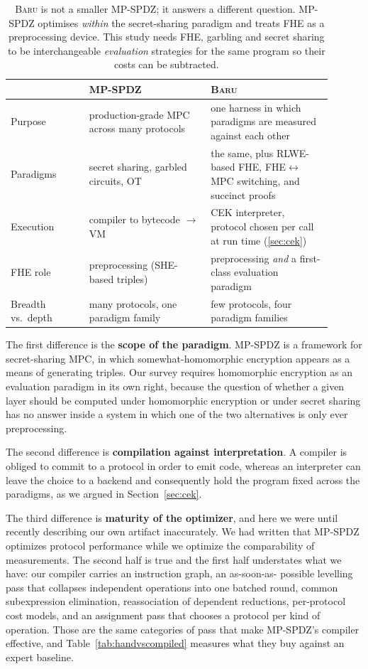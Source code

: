\documentclass[11pt]{article}
\newcommand{\Baru}{\textsc{Baru}}
\begin{document}
\begin{table}[t]
\centering
\small
\begin{tabular}{@{}p{0.22\linewidth}p{0.34\linewidth}p{0.34\linewidth}@{}}
\toprule
 & MP-SPDZ~\cite{MPSPDZ} & \Baru{} \\
\midrule
Purpose & production-grade MPC across many protocols & one harness in which paradigms are measured against each other \\
Paradigms & secret sharing, garbled circuits, OT & the same, plus RLWE-based FHE, FHE$\leftrightarrow$MPC switching, and succinct proofs \\
Execution & compiler to bytecode $\to$ VM & CEK interpreter, protocol chosen per call at run time (\cref{sec:cek}) \\
FHE role & preprocessing (SHE-based triples) & preprocessing \emph{and} a first-class evaluation paradigm \\
Breadth vs.\ depth & many protocols, one paradigm family & few protocols, four paradigm families \\
\bottomrule
\end{tabular}
\caption{\Baru{} is not a smaller MP-SPDZ; it answers a different question. MP-SPDZ
optimises \emph{within} the secret-sharing paradigm and treats FHE as a preprocessing
device. This study needs FHE, garbling and secret sharing to be interchangeable
\emph{evaluation} strategies for the same program so their costs can be subtracted.}
\label{tab:mpspdz}
\end{table}

The first difference is the \textbf{scope of the paradigm}. MP-SPDZ is a framework for
secret-sharing MPC, in which somewhat-homomorphic encryption appears as a means of generating
triples. Our survey requires homomorphic encryption as an evaluation paradigm in its own
right, because the question of whether a given layer should be computed under homomorphic
encryption or under secret sharing has no answer inside a system in which one of the two
alternatives is only ever preprocessing.

The second difference is \textbf{compilation against interpretation}. A compiler is obliged to
commit to a protocol in order to emit code, whereas an interpreter can leave the choice to a
backend and consequently hold the program fixed across the paradigms, as we argued in
Section~\ref{sec:cek}.

The third difference is \textbf{maturity of the optimizer}, and here we were until recently
describing our own artifact inaccurately. We had written that MP-SPDZ optimizes protocol
performance while we optimize the comparability of measurements. The second half is true and the
first half understates what we have: our compiler carries an instruction graph, an as-soon-as-
possible levelling pass that collapses independent operations into one batched round, common
subexpression elimination, reassociation of dependent reductions, per-protocol cost models, and
an assignment pass that chooses a protocol per kind of operation. Those are the same categories
of pass that make MP-SPDZ's compiler effective, and Table~\ref{tab:handvscompiled} measures what
they buy against an expert baseline.
\end{document}
